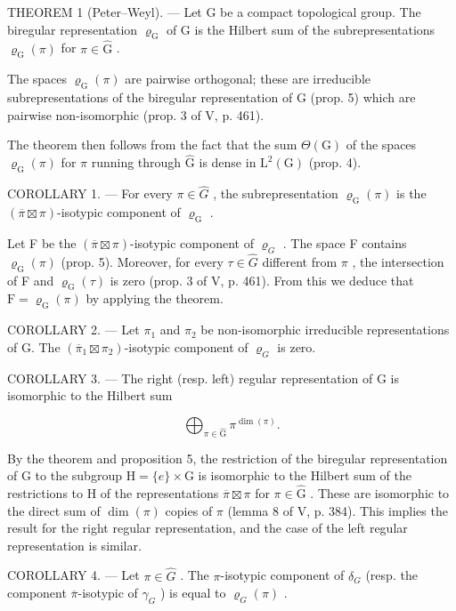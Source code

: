 THEOREM 1 (Peter--Weyl). --- Let G be a compact topological group. The biregular representation \(\varrho_{\mathrm{G}}\) of G is the Hilbert sum of the subrepresentations \(\varrho_{\mathrm{G}}(\pi)\) for \(\pi \in \widehat{\mathrm{G}}\) .

The spaces \(\varrho_{\mathrm{G}}(\pi)\) are pairwise orthogonal; these are irreducible subrepresentations of the biregular representation of G (prop. 5) which are pairwise non-isomorphic (prop. 3 of V, p. 461).

The theorem then follows from the fact that the sum \(\Theta(\mathrm{G})\) of the spaces \(\varrho_{\mathrm{G}}(\pi)\) for \(\pi\) running through \(\widehat{\mathrm{G}}\) is dense in \(\mathrm{L}^2(\mathrm{G})\) (prop. 4).

COROLLARY 1. --- For every \(\pi\in\widehat{G}\) , the subrepresentation \(\varrho_{\mathrm{G}}(\pi)\) is the \((\overline{\pi}\boxtimes\pi)\)-isotypic component of \(\varrho_{\mathrm{G}}\) .

Let F be the \((\overline{\pi} \boxtimes \pi)\)-isotypic component of \(\varrho_{G}\) . The space F contains \(\varrho_{\mathrm{G}}(\pi)\) (prop. 5). Moreover, for every \(\tau \in \widehat{G}\) different from \(\pi\) , the intersection of F and \(\varrho_{\mathrm{G}}(\tau)\) is zero (prop. 3 of V, p. 461). From this we deduce that \(\mathrm{F} = \varrho_{\mathrm{G}}(\pi)\) by applying the theorem.

COROLLARY 2. --- Let \(\pi_1\) and \(\pi_2\) be non-isomorphic irreducible representations of G. The \((\overline{\pi}_1 \boxtimes \pi_2)\)-isotypic component of \(\varrho_G\) is zero.

COROLLARY 3. --- The right (resp. left) regular representation of G is isomorphic to the Hilbert sum

\[
\bigoplus_ {\pi \in \widehat {\mathrm{G}}} \pi^ {\dim (\pi)}.
\]

By the theorem and proposition 5, the restriction of the biregular representation of G to the subgroup \(\mathrm{H} = \{e\} \times \mathrm{G}\) is isomorphic to the Hilbert sum of the restrictions to H of the representations \(\overline{\pi} \boxtimes \pi\) for \(\pi \in \widehat{\mathrm{G}}\) . These are isomorphic to the direct sum of \(\dim(\pi)\) copies of \(\pi\) (lemma 8 of V, p. 384). This implies the result for the right regular representation, and the case of the left regular representation is similar.

COROLLARY 4. --- Let \(\pi\in\widehat{G}\) . The \(\pi\)-isotypic component of \(\delta_{G}\) (resp. the component \(\overline{\pi}\)-isotypic of \(\gamma_{G}\) ) is equal to \(\varrho_{G}(\pi)\) .

